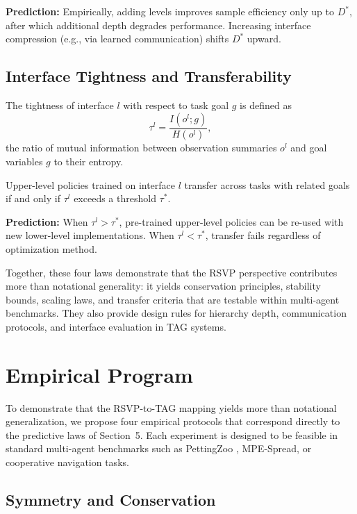 \documentclass[11pt,a4paper]{article}
\begin{document}
\noindent
\textbf{Prediction:} Empirically, adding levels improves sample efficiency only
up to $D^\ast$, after which additional depth degrades performance. Increasing
interface compression (e.g., via learned communication) shifts $D^\ast$ upward.

\subsection{Interface Tightness and Transferability}

\begin{definition}
The tightness of interface $l$ with respect to task goal $g$ is defined as
\[
\tau^l = \frac{I(o^l; g)}{H(o^l)},
\]
the ratio of mutual information between observation summaries $o^l$ and goal
variables $g$ to their entropy.
\end{definition}

\begin{proposition}
Upper-level policies trained on interface $l$ transfer across tasks with
related goals if and only if $\tau^l$ exceeds a threshold $\tau^\ast$.
\end{proposition}

\noindent
\textbf{Prediction:} When $\tau^l > \tau^\ast$, pre-trained upper-level policies
can be re-used with new lower-level implementations. When $\tau^l < \tau^\ast$,
transfer fails regardless of optimization method.

\medskip
Together, these four laws demonstrate that the RSVP perspective contributes
more than notational generality: it yields conservation principles, stability
bounds, scaling laws, and transfer criteria that are testable within multi-agent
benchmarks. They also provide design rules for hierarchy depth, communication
protocols, and interface evaluation in TAG systems.

\section{Empirical Program}

To demonstrate that the RSVP-to-TAG mapping yields more than notational
generalization, we propose four empirical protocols that correspond directly to
the predictive laws of Section~5. Each experiment is designed to be feasible in
standard multi-agent benchmarks such as PettingZoo
\citep{terry2021pettingzoo}, MPE-Spread, or cooperative navigation tasks.

\subsection{Symmetry and Conservation}
\end{document}
